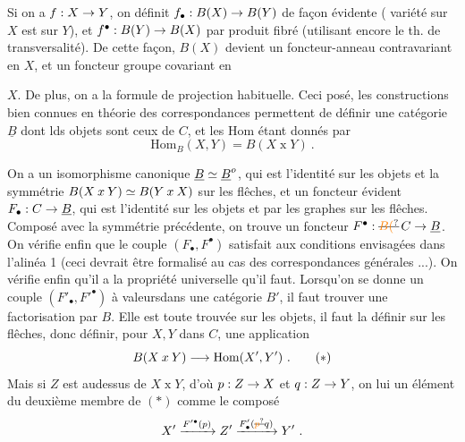 
Si on a $f:X\to Y$, on définit $f_{\bullet}:B(X)\to B(Y)$ de façon évidente ( variété sur $X$ est sur $Y$), et $f^{\bullet}:B(Y)\to B(X)$ par produit fibré (utilisant encore le th. de transversalité). De cette façon, $B(X)$ devient un foncteur-anneau  contravariant en $X$, et un foncteur groupe covariant en


$X$. De plus, on a la formule  de projection habituelle. Ceci posé, les constructions bien connues en théorie des correspondances permettent de définir une catégorie $\underline{B}$ dont lds objets sont ceux de $C$, et les $\mathrm{Hom}$ étant donnés par
\[
\mathrm{Hom}_B(X,Y)=B(X\mathbin{x}Y)\ .
\]

On a un isomorphisme canonique $\underline{B}\simeq\underline{B}^{o}$, qui est l'identité sur les objets et la symmétrie $B(X\mathbin{x}Y)\simeq B(Y\mathbin{x}X)$ sur les flêches, et un foncteur évident  $F_{\bullet}:C\to\underline{B}$, qui est l'identité sur les objets et  par les graphes sur les flêches. Composé avec la symmétrie précédente, on trouve un foncteur $F^{\bullet}:\deleted{\unsure{B(}}\,C\handwritten{\to}\underline{B}$. On vérifie enfin que le couple $(F_{\bullet},F^{\bullet})$ satisfait aux conditions envisagées dans l'alinéa 1 (ceci  devrait être formalisé au cas des correspondances générales ...). On vérifie enfin qu'il a la propriété universelle qu'il faut. Lorsqu'on se donne un couple $(F'_{\bullet},F'^{\bullet})$ à valeursdans une catégorie $B'$, il faut trouver une factorisation par $B$. Elle est toute trouvée sur les objets, il faut la définir sur les flêches, donc définir, pour $X,Y$ dans $C$, une application
\begingroup
\makeatletter\tagsleft@true\makeatother
\[
B(X\mathbin{x}Y)\handwritten{\longrightarrow}\mathrm{Hom}(X',Y')\ . \tag*{$(\ast)$}
\]
\endgroup
Mais si $Z$ est audessus de $X\mathbin{x}Y$, d'où $p:Z\to X$ et $q:Z\to Y$, on lui  un élément du deuxième membre de $(\ast)$ comme le composé
\[
X'\xrightarrow{F'^{\bullet}(p)} Z'\xrightarrow{F'_{\bullet}(\deleted{\unsure{p}}q)}Y'\ .
\]

